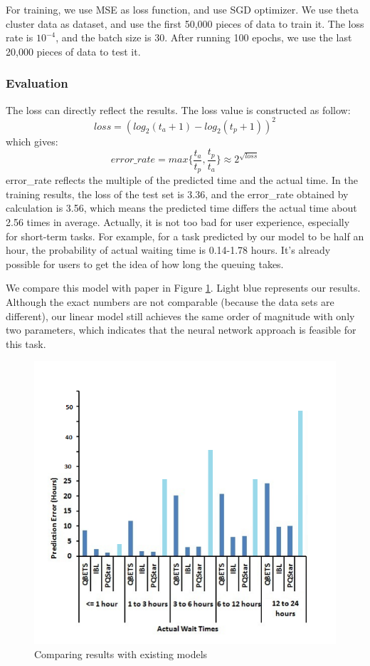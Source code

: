 \documentclass[conference,compsoc]{IEEEtran}
\begin{document}
For training, we use MSE as loss function, and use SGD optimizer. We use  theta cluster data as dataset, and use the first 50,000 pieces of data to train it. The loss rate is $10^{-4}$, and the batch size is 30. After running 100 epochs, we use the last 20,000 pieces of data to test it.

\subsubsection{Evaluation}

The loss can directly reflect the results. The loss value is constructed as follow:
$$
loss = (log_2(t_a+1)-log_2(t_p+1))^2
$$
which gives:
$$
error\_rate = max\{\frac{t_a}{t_p}, \frac{t_p}{t_a}\} \approx 2^{\sqrt{loss}}
$$
error\_rate reflects the multiple of the predicted time and the actual time. In the training results, the loss of the test set is 3.36, and the error\_rate obtained by calculation is 3.56, which means the predicted time differs the actual time about 2.56 times in average. Actually, it is not too bad for user experience, especially for short-term tasks. For example, for a task predicted by our model to be half an hour, the probability of actual waiting time is 0.14-1.78 hours. It's already possible for users to get the idea of how long the queuing takes.

We compare this model with paper\cite{kumar2012identifying} in Figure \ref{compare.png}. Light blue represents our results. Although the exact numbers are not comparable (because the data sets are different), our linear model still achieves the same order of magnitude with only two parameters, which indicates that the neural network approach is feasible for this task.

	\begin{figure}[htbp]   %
	\centering
	\includegraphics[width=\linewidth,scale=1.00]{compare.png}
	\caption{Comparing results with existing models}
	\label{compare.png}
	\end{figure}
\end{document}
